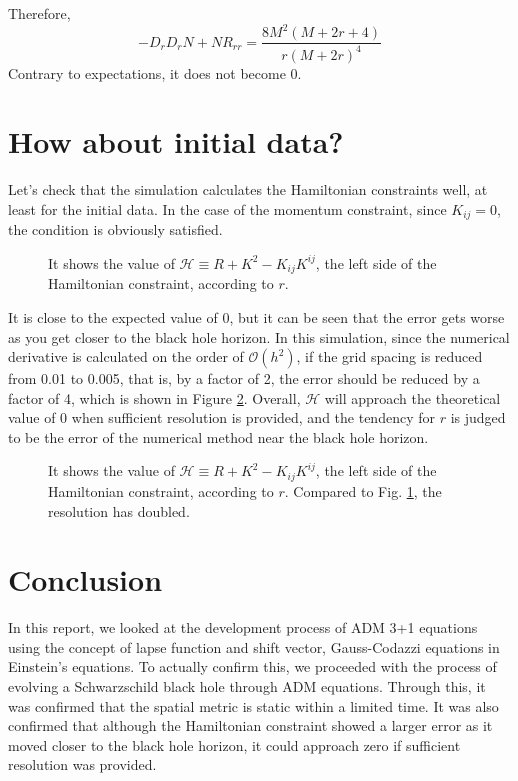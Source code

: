 Therefore,
\begin{equation}
	-D_rD_rN + NR_{rr} = \frac{8 M^{2} \left(M + 2 r + 4\right)}{r \left(M + 2 r\right)^{4}}
\end{equation}
Contrary to expectations, it does not become 0.

\section{How about initial data?}
Let's check that the simulation calculates the Hamiltonian constraints well, at least for the initial data. In the case of the momentum constraint, since $K_{ij} = 0$, the condition is obviously satisfied.
\begin{figure}[H]
	\centering
	
	\caption{It shows the value of $\mathcal{H}\equiv R+K^2-K_{ij}K^{ij}$, the left side of the Hamiltonian constraint, according to $r$.}
	\label{fig:hamil_err}
\end{figure}
It is close to the expected value of 0, but it can be seen that the error gets worse as you get closer to the black hole horizon. In this simulation, since the numerical derivative is calculated on the order of $\mathcal{O}(h^2)$, if the grid spacing is reduced from 0.01 to 0.005, that is, by a factor of 2, the error should be reduced by a factor of 4, which is shown in Figure \ref{fig:hamil_err1}. Overall, $\mathcal{H}$ will approach the theoretical value of 0 when sufficient resolution is provided, and the tendency for $r$ is judged to be the error of the numerical method near the black hole horizon.

\begin{figure}[H]
	\centering
	
	\caption{It shows the value of $\mathcal{H}\equiv R+K^2-K_{ij}K^{ij}$, the left side of the Hamiltonian constraint, according to $r$. Compared to Fig. \ref{fig:hamil_err}, the resolution has doubled.}
	\label{fig:hamil_err1}
\end{figure}

\section{Conclusion}


In this report, we looked at the development process of ADM 3+1 equations using the concept of lapse function and shift vector, Gauss-Codazzi equations in Einstein's equations. To actually confirm this, we proceeded with the process of evolving a Schwarzschild black hole through ADM equations. Through this, it was confirmed that the spatial metric is static within a limited time. It was also confirmed that although the Hamiltonian constraint showed a larger error as it moved closer to the black hole horizon, it could approach zero if sufficient resolution was provided.

